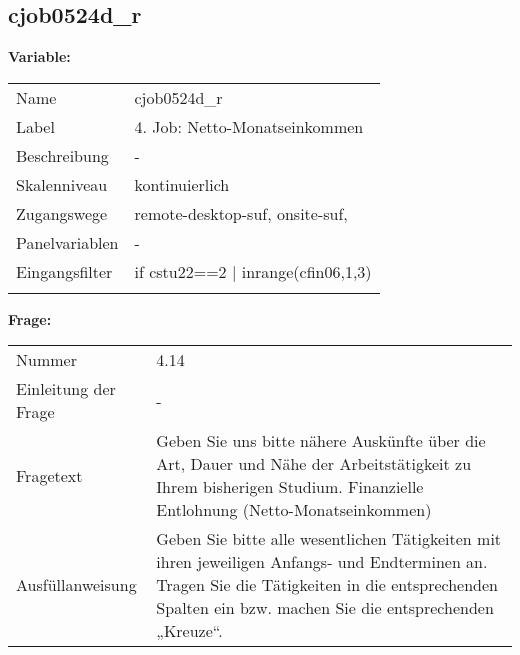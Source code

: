 	
	
	\subsection{cjob0524d\_r}
	\label{subSection:cjob0524d_r}

	\noindent\textbf{Variable:}\\
		\begin{tabular}{lL{11.3cm}}
			\label{tableVariable:cjob0524d_r}
			Name & cjob0524d\_r \\
			Label & 4. Job: Netto-Monatseinkommen \\
			Beschreibung & - \\
			Skalenniveau & kontinuierlich \\
			Zugangswege &
				remote-desktop-suf,
				onsite-suf,
 \\
			Panelvariablen & -
			 \\
			Eingangsfilter & if cstu22==2 | inrange(cfin06,1,3) \\
 \\
		\end{tabular}

		\vspace*{1 cm}
		\noindent\textbf{Frage:}\\
		\begin{tabular}{lL{11.3cm}}
			\label{tableQuestion:cjob0524d_r}
			Nummer & 4.14 \\
			Einleitung der Frage & - \\
			Fragetext & Geben Sie uns bitte nähere Auskünfte über die Art, Dauer und Nähe der Arbeitstätigkeit zu Ihrem bisherigen Studium.
Finanzielle Entlohnung
(Netto-Monatseinkommen) \\
			Ausfüllanweisung & Geben Sie bitte alle wesentlichen Tätigkeiten mit ihren jeweiligen Anfangs- und Endterminen an. Tragen Sie die Tätigkeiten in die entsprechenden Spalten ein bzw. machen Sie die entsprechenden „Kreuze“. \\
		\end{tabular}




